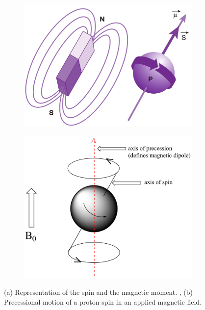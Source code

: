  \begin{figure}
   \centering
   \begin{subfigure}{.4\textwidth}
     \centering
     \includegraphics[width=0.7\linewidth]{images/magnetic_dipole.png}
     \caption{}
     \label{fig:spin_proton}
   \end{subfigure}%
   \begin{subfigure}{.6\textwidth}
     \centering
     \includegraphics[width=0.7\linewidth]{images/precession.png}
     \caption{}
     \label{fig:spin_precession}
   \end{subfigure}
   \caption{(a) Representation of the spin and the magnetic moment. \cite{KastlerVetterIRM}, (b) Precessional motion of a proton spin in an applied magnetic field. \cite{organicChemestry}}
\end{figure}

